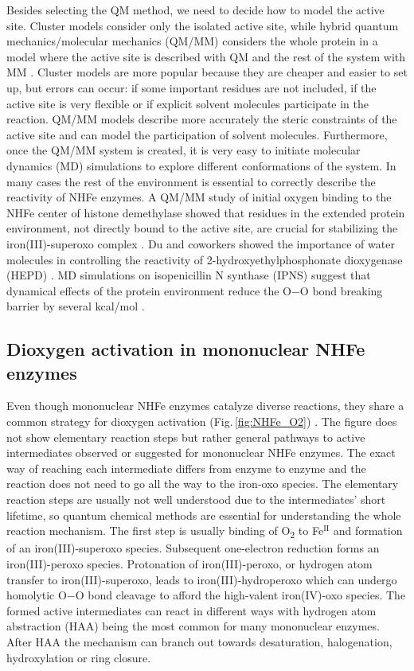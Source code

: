 Besides selecting the QM method, we need to decide how to model the active site. Cluster models consider only the isolated active site, while hybrid quantum mechanics/molecular mechanics (QM/MM) considers the whole protein in a model where the active site is described with QM and the rest of the system with MM \cite{Blomberg2014}. Cluster models are more popular because they are cheaper and easier to set up, but errors can occur: if some important residues are not included, if the active site is very flexible or if explicit solvent molecules participate in the reaction. QM/MM models describe more accurately the steric constraints of the active site and can model the participation of solvent molecules. Furthermore, once the QM/MM system is created, it is very easy to initiate molecular dynamics (MD) simulations to explore different conformations of the system. In many cases the rest of the environment is essential to correctly describe the reactivity of NHFe enzymes. A QM/MM study of initial oxygen binding to the NHFe center of histone demethylase showed that residues in the extended protein environment, not directly bound to the active site, are crucial for stabilizing the iron(III)-superoxo complex \cite{Cortopassi2015}. Du and coworkers showed the importance of water molecules in controlling the reactivity of 2-hydroxyethylphosphonate dioxygenase (HEPD) \cite{Du2012}. MD simulations on isopenicillin N synthase (IPNS) suggest that dynamical effects of the protein environment reduce the O$-$O bond breaking barrier by several kcal/mol \cite{Kawatsu2011}. 


\subsection{Dioxygen activation in mononuclear NHFe enzymes}
Even though mononuclear NHFe enzymes catalyze diverse reactions, they share a common strategy for dioxygen activation (Fig.\,\ref{fig:NHFe_O2}) \cite{Ray2014}. The figure does not show elementary reaction steps but rather general pathways to active intermediates observed or suggested for mononuclear NHFe enzymes. The exact way of reaching each intermediate differs from enzyme to enzyme and the reaction does not need to go all the way to the iron-oxo species. The elementary reaction steps are usually not well understood due to the intermediates' short lifetime, so quantum chemical methods are essential for understanding the whole reaction mechanism. The first step is usually binding of O\textsubscript{2} to Fe$^{\mathrm{II}}$ and formation of an iron(III)-superoxo species. Subsequent one-electron reduction forms an iron(III)-peroxo species. Protonation of iron(III)-peroxo, or hydrogen atom transfer to iron(III)-superoxo, leads to iron(III)-hydroperoxo which can undergo homolytic O$-$O bond cleavage to afford the high-valent iron(IV)-oxo species. The formed active intermediates can react in different ways with hydrogen atom abstraction (HAA) being the most common for many mononuclear enzymes. After HAA the mechanism can branch out towards desaturation, halogenation, hydroxylation or ring closure.

